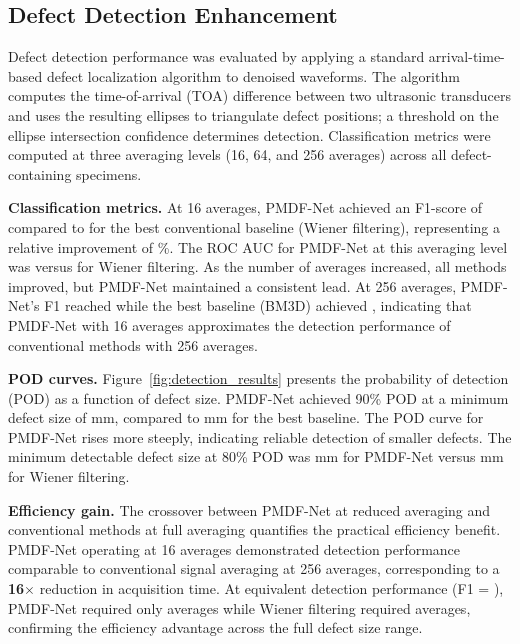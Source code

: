 \subsection{Defect Detection Enhancement}
\label{sec:results-detection}

Defect detection performance was evaluated by applying a standard arrival-time-based defect localization algorithm to denoised waveforms. The algorithm computes the time-of-arrival (TOA) difference between two ultrasonic transducers and uses the resulting ellipses to triangulate defect positions; a threshold on the ellipse intersection confidence determines detection. Classification metrics were computed at three averaging levels (16, 64, and 256 averages) across all defect-containing specimens.

\textbf{Classification metrics.} At 16 averages, PMDF-Net achieved an F1-score of  compared to  for the best conventional baseline (Wiener filtering), representing a relative improvement of \%. The ROC AUC for PMDF-Net at this averaging level was  versus  for Wiener filtering. As the number of averages increased, all methods improved, but PMDF-Net maintained a consistent lead. At 256 averages, PMDF-Net's F1 reached  while the best baseline (BM3D) achieved , indicating that PMDF-Net with 16 averages approximates the detection performance of conventional methods with 256 averages.

\textbf{POD curves.} Figure~\ref{fig:detection_results} presents the probability of detection (POD) as a function of defect size. PMDF-Net achieved 90\% POD at a minimum defect size of  mm, compared to  mm for the best baseline. The POD curve for PMDF-Net rises more steeply, indicating reliable detection of smaller defects. The minimum detectable defect size at 80\% POD was  mm for PMDF-Net versus  mm for Wiener filtering.

\textbf{Efficiency gain.} The crossover between PMDF-Net at reduced averaging and conventional methods at full averaging quantifies the practical efficiency benefit. PMDF-Net operating at 16 averages demonstrated detection performance comparable to conventional signal averaging at 256 averages, corresponding to a \textbf{16$\times$} reduction in acquisition time. At equivalent detection performance (F1 = ), PMDF-Net required only  averages while Wiener filtering required  averages, confirming the efficiency advantage across the full defect size range.

